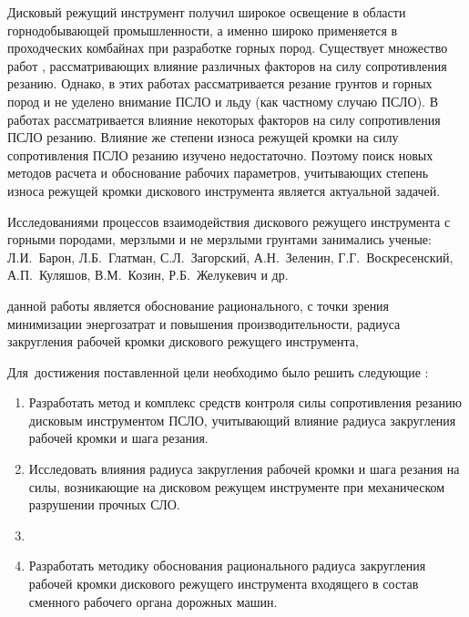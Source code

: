 Дисковый режущий инструмент получил широкое освещение в области горнодобывающей промышленности, а именно широко применяется в проходческих комбайнах при разработке горных пород. Существует множество работ \cite{BaronTang, BaronShar, JelukevichGrunt, FomichevVelos} , рассматривающих влияние различных факторов на силу сопротивления резанию. Однако, в этих работах рассматривается резание грунтов и горных пород и не уделено внимание ПСЛО и льду (как частному случаю ПСЛО). В работах \cite{GanjaTHESIS}  рассматривается влияние некоторых факторов на силу сопротивления ПСЛО резанию. Влияние же степени износа режущей кромки на силу сопротивления ПСЛО резанию изучено недостаточно. Поэтому поиск новых методов расчета и обоснование рабочих параметров, учитывающих степень износа режущей кромки дискового инструмента является актуальной задачей.


{\progress} Исследованиями процессов взаимодействия дискового режущего инструмента с горными породами, мерзлыми и не мерзлыми грунтами занимались ученые: Л.И.~Барон, Л.Б.~Глатман, С.Л.~Загорский, А.Н.~Зеленин, Г.Г.~Воскресенский, А.П.~Куляшов, В.М.~Козин, Р.Б.~Желукевич и др.

{\aim} данной работы является обоснование рационального, с точки зрения минимизации энергозатрат и повышения производительности, радиуса закругления рабочей кромки дискового режущего инструмента,  

Для~достижения поставленной цели необходимо было решить следующие {\tasks}:
\begin{enumerate}
  \item Разработать метод и комплекс средств контроля силы сопротивления резанию дисковым инструментом ПСЛО, учитывающий влияние радиуса закругления рабочей кромки и шага резания.
  \item Исследовать влияния радиуса закругления рабочей кромки и шага резания на силы, возникающие на дисковом режущем инструменте при механическом разрушении прочных СЛО.
  \item {}
  \item Разработать методику обоснования рационального радиуса закругления рабочей кромки дискового режущего инструмента входящего в состав сменного рабочего органа дорожных машин.
\end{enumerate}

